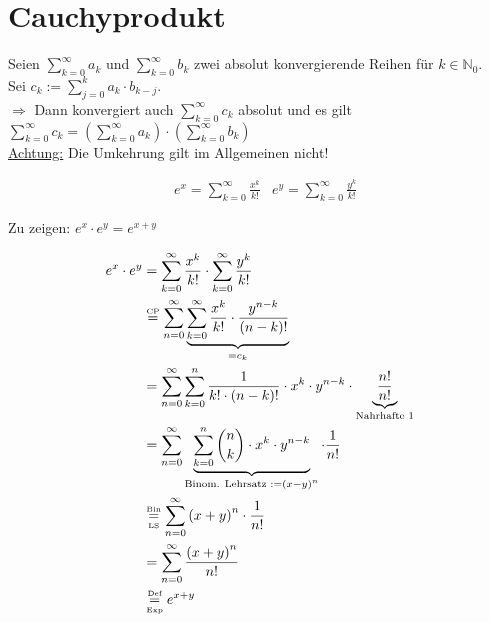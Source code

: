 \documentclass[a4paper,12pt]{article}
\begin{document}
	\section{Cauchyprodukt}
	\begin{defi}
		Seien $\sum_{k=0}^{\infty} a_k$ und $\sum_{k=0}^{\infty} b_k$ zwei absolut konvergierende Reihen für $k \in \mathbb{N}_0$.\\
		Sei $c_k := \sum_{j=0}^{k} a_k \cdot b_{k-j}$.\\
		
		$\Rightarrow$ Dann konvergiert auch $\sum_{k=0}^{\infty} c_k$ absolut und es gilt\\
		$\sum_{k=0}^{\infty} c_k = \left(\sum_{k=0}^{\infty} a_k\right) \cdot \left(\sum_{k=0}^{\infty} b_k\right)$\\
		
		\underline{Achtung:} Die Umkehrung gilt im Allgemeinen nicht!
	\end{defi}
	\begin{bsp}
		\begin{align*}
			&e^x = \sum_{k=0}^{\infty} \frac{x^k}{k!} &e^y = \sum_{k=0}^{\infty} \frac{y^k}{k!}
		\end{align*}
		\begin{center}
			Zu zeigen: $e^x \cdot e^y = e^{x+y}$
		\end{center}
	\end{bsp}
	\begin{align*}
		e^x \cdot e^y &= \sum_{k=0}^{\infty} \frac{x^k}{k!} \cdot \sum_{k=0}^{\infty} \frac{y^k}{k!}\\
		&\overset{\text{\tiny CP}}{=} \sum_{n=0}^{\infty} \underbrace{\sum_{k=0}^{\infty} \frac{x^k}{k!} \cdot \frac{y^{n-k}}{\left(n-k\right)!}}_{= c_k}\\
		&= \sum_{n=0}^{\infty} \sum_{k=0}^{n} \frac{1}{k! \cdot \left(n-k\right)!} \cdot x^k \cdot y^{n-k} \cdot \underbrace{\frac{n!}{n!}}_{\text{Nahrhafte 1}}\\
		&= \sum_{n=0}^{\infty} \underbrace{\sum_{k=0}^{n} \binom{n}{k} \cdot x^k \cdot y^{n-k}}_{\text{Binom. Lehrsatz }:= \left(x-y\right)^n} \cdot \frac{1}{n!}\\
		&\overset{\text{\tiny Bin}}{\underset{\text{\tiny LS}}{=}} \sum_{n=0}^{\infty} \left(x+y\right)^n \cdot \frac{1}{n!}\\
		&= \sum_{n=0}^{\infty} \frac{\left(x+y\right)^n}{n!}\\
		&\overset{\text{\tiny Def}}{\underset{\text{\tiny Exp}}{=}} e^{x+y}
	\end{align*}
	\newpage
\end{document}
